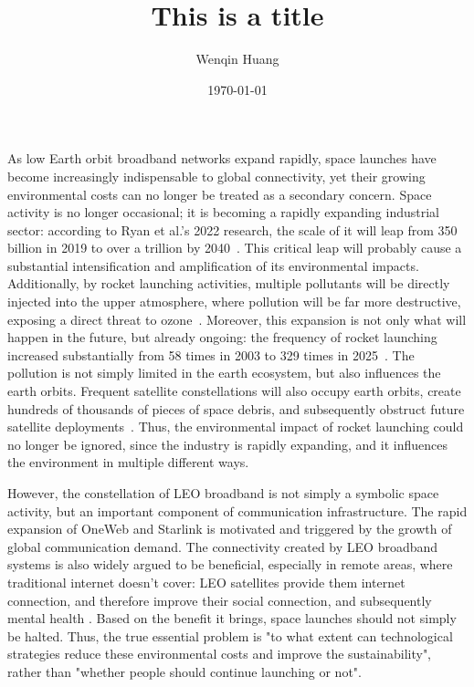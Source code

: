 \documentclass[12pt]{article}
\title{This is a title}
\author{Wenqin Huang}
\date{\today}
\begin{document}
\maketitle


As low Earth orbit broadband networks expand rapidly, space launches have become increasingly indispensable to global connectivity, yet their growing environmental costs can no longer be treated as a secondary concern. Space activity is no longer occasional; it is becoming a rapidly expanding industrial sector: according to Ryan et al.'s 2022 research, the scale of it will leap from 350 billion in 2019 to over a trillion by 2040~\citep{ryan2022ozone,bushnell2018newspace}. This critical leap will probably cause a substantial intensification and amplification of its environmental impacts. Additionally, by rocket launching activities, multiple pollutants will be directly injected into the upper atmosphere, where pollution will be far more destructive, exposing a direct threat to ozone~\citep{ryan2022ozone,kokkinakis2022pollution}. Moreover, this expansion is not only what will happen in the future, but already ongoing: the frequency of rocket launching increased substantially from 58 times in 2003 to 329 times in 2025~\citep{mcdowell2025space}. The pollution is not simply limited in the earth ecosystem, but also influences the earth orbits. Frequent satellite constellations will also occupy earth orbits, create hundreds of thousands of pieces of space debris, and subsequently obstruct future satellite deployments~\citep{torres2020reusable}. Thus, the environmental impact of rocket launching could no longer be ignored, since the industry is rapidly expanding, and it influences the environment in multiple different ways.



However, the constellation of LEO broadband is not simply a symbolic space activity, but an important component of communication infrastructure. The rapid expansion of OneWeb and Starlink is motivated and triggered by the growth of global communication demand. The connectivity created by LEO broadband systems is also widely argued to be beneficial, especially in remote areas, where traditional internet doesn't cover: LEO satellites provide them internet connection, and therefore improve their social connection, and subsequently mental health \citep{osoro2025leo,sandau2010smallsat}. Based on the benefit it brings, space launches should not simply be halted. Thus, the true essential problem is "to what extent can technological strategies reduce these environmental costs and improve the sustainability", rather than "whether people should continue launching or not".
\end{document}
